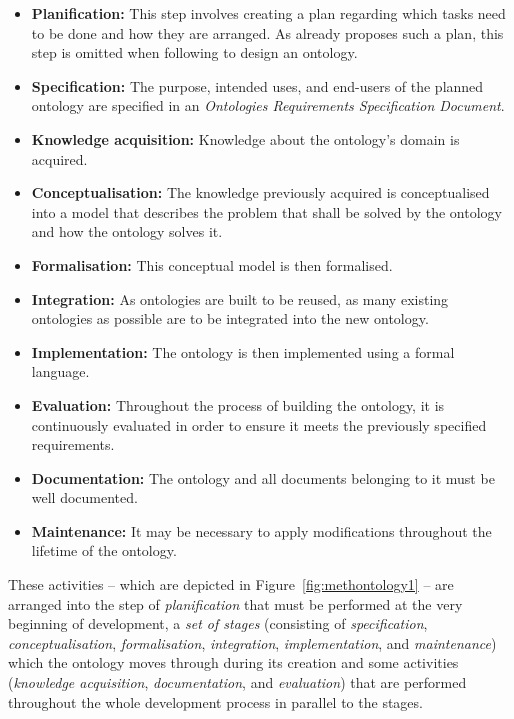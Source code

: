 \begin{itemize}
  \item \textbf{Planification:} This step involves creating a plan regarding which tasks need to be done and how they are arranged. As \methontology already proposes such a plan, this step is omitted when following \methontology to design an ontology.
  \item \textbf{Specification:} The purpose, intended uses, and end-users of the planned ontology are specified in an \emph{Ontologies Requirements Specification Document}.
  \item \textbf{Knowledge acquisition:} Knowledge about the ontology's domain is acquired.
  \item \textbf{Conceptualisation:} The knowledge previously acquired is conceptualised into a model that describes the problem that shall be solved by the ontology and how the ontology solves it.
  \item \textbf{Formalisation:} This conceptual model is then formalised.
  \item \textbf{Integration:} As ontologies are built to be reused, as many existing ontologies as possible are to be integrated into the new ontology.
  \item \textbf{Implementation:} The ontology is then implemented using a formal language.
  \item \textbf{Evaluation:} Throughout the process of building the ontology, it is continuously evaluated in order to ensure it meets the previously specified requirements.
  \item \textbf{Documentation:} The ontology and all documents belonging to it must be well documented.
  \item \textbf{Maintenance:} It may be necessary to apply modifications throughout the lifetime of the ontology.
\end{itemize}

These activities -- which are depicted in Figure~\ref{fig:methontology1} -- are arranged into the step of \emph{planification} that must be performed at the very beginning of development, a \emph{set of stages} (consisting of \emph{specification}, \emph{conceptualisation}, \emph{formalisation}, \emph{integration}, \emph{implementation}, and \emph{maintenance}) which the ontology moves through during its creation and some activities (\emph{knowledge acquisition}, \emph{documentation}, and \emph{evaluation}) that are performed throughout the whole development process in parallel to the stages.

